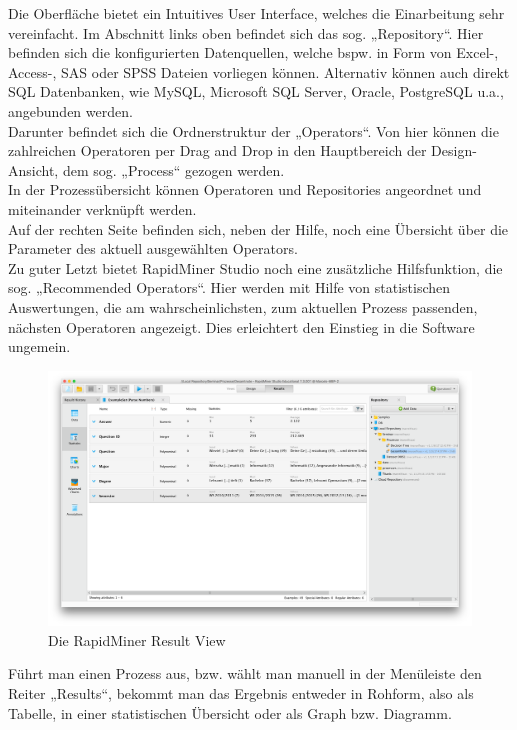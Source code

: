 Die Oberfläche bietet ein Intuitives User Interface, welches die Einarbeitung
sehr vereinfacht. Im Abschnitt links oben befindet sich das sog. „Repository“.
Hier befinden sich die konfigurierten Datenquellen, welche bspw. in Form von
Excel-, Access-, SAS oder SPSS Dateien vorliegen können. Alternativ können auch
direkt SQL Datenbanken, wie MySQL, Microsoft SQL Server, Oracle, PostgreSQL
u.a., angebunden werden. \\
Darunter befindet sich die Ordnerstruktur der „Operators“. Von hier können die
zahlreichen Operatoren per Drag and Drop in den Hauptbereich der Design-Ansicht,
dem sog. „Process“ gezogen werden. \\
In der Prozessübersicht können Operatoren und Repositories angeordnet und
miteinander verknüpft werden. \\
Auf der rechten Seite befinden sich, neben der Hilfe, noch eine Übersicht über
die Parameter des aktuell ausgewählten Operators. \\
Zu guter Letzt bietet RapidMiner Studio noch eine zusätzliche Hilfsfunktion,
die sog. „Recommended Operators“. Hier werden mit Hilfe von statistischen
Auswertungen, die am wahrscheinlichsten, zum aktuellen Prozess passenden,
nächsten Operatoren angezeigt. Dies erleichtert den Einstieg in die Software ungemein.

\begin{figure}[htb]
  \includegraphics[width=\textwidth]{gfx/rm3.png}
	\caption{Die RapidMiner Result View}
	\label{fig:software:rm:res}
\end{figure}

Führt man einen Prozess aus, bzw. wählt man manuell in der Menüleiste den Reiter
„Results“, bekommt man das Ergebnis entweder in Rohform, also als Tabelle, in
einer statistischen Übersicht oder als Graph bzw. Diagramm.


